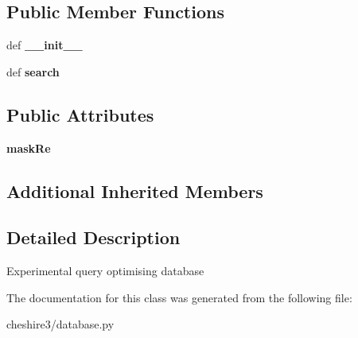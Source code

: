 \subsection*{Public Member Functions}
\begin{DoxyCompactItemize}
\item 
\hypertarget{classcheshire3_1_1database_1_1_optimising_database_ae09f950ce74eed3094e77a77a7f1f646}{def {\bfseries \-\_\-\-\_\-init\-\_\-\-\_\-}}\label{classcheshire3_1_1database_1_1_optimising_database_ae09f950ce74eed3094e77a77a7f1f646}

\item 
\hypertarget{classcheshire3_1_1database_1_1_optimising_database_aafe8f8910528c5ec529fd29a18b3ad81}{def {\bfseries search}}\label{classcheshire3_1_1database_1_1_optimising_database_aafe8f8910528c5ec529fd29a18b3ad81}

\end{DoxyCompactItemize}
\subsection*{Public Attributes}
\begin{DoxyCompactItemize}
\item 
\hypertarget{classcheshire3_1_1database_1_1_optimising_database_ac6affa3faa278409113ee44d9b82daf3}{{\bfseries mask\-Re}}\label{classcheshire3_1_1database_1_1_optimising_database_ac6affa3faa278409113ee44d9b82daf3}

\end{DoxyCompactItemize}
\subsection*{Additional Inherited Members}


\subsection{Detailed Description}
\begin{DoxyVerb}Experimental query optimising database \end{DoxyVerb}
 

The documentation for this class was generated from the following file\-:\begin{DoxyCompactItemize}
\item 
cheshire3/database.\-py\end{DoxyCompactItemize}
